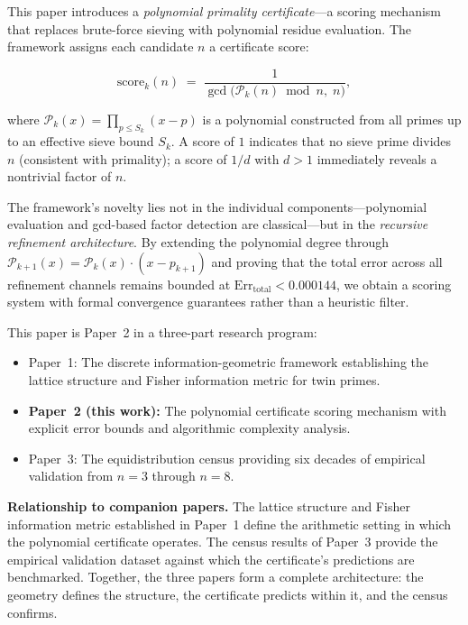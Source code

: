 \documentclass[11pt]{article}
\begin{document}
This paper introduces a \emph{polynomial primality certificate}---a scoring mechanism
that replaces brute-force sieving with polynomial residue evaluation. The framework
assigns each candidate $n$ a certificate score:

\begin{equation}
\mathrm{score}_k(n) \;=\;
\frac{1}{\gcd\!\bigl(\mathcal{P}_k(n)\bmod n,\; n\bigr)},
\end{equation}

\noindent where $\mathcal{P}_k(x) = \prod_{p \le S_k}(x-p)$ is a polynomial
constructed from all primes up to an effective sieve bound $S_k$. A score of $1$
indicates that no sieve prime divides $n$ (consistent with primality); a score
of $1/d$ with $d > 1$ immediately reveals a nontrivial factor of $n$.

The framework's novelty lies not in the individual components---polynomial
evaluation and gcd-based factor detection are classical---but in the
\emph{recursive refinement architecture}. By extending the polynomial degree through
$\mathcal{P}_{k+1}(x) = \mathcal{P}_k(x)\cdot(x-p_{k+1})$ and proving that the
total error across all refinement channels remains bounded at
$\mathrm{Err}_\mathrm{total} < 0.000144$, we obtain a scoring system with formal
convergence guarantees rather than a heuristic filter.

This paper is Paper~2 in a three-part research program:
\begin{itemize}
  \item Paper~1: The discrete information-geometric framework establishing
        the lattice structure and Fisher information metric for twin primes.
  \item \textbf{Paper~2 (this work):} The polynomial certificate scoring mechanism
        with explicit error bounds and algorithmic complexity analysis.
  \item Paper~3: The equidistribution census providing six decades of empirical
        validation from $n=3$ through $n=8$.
\end{itemize}

\noindent\textbf{Relationship to companion papers.} The lattice structure and
Fisher information metric established in Paper~1 define the arithmetic setting
in which the polynomial certificate operates. The census results of Paper~3
provide the empirical validation dataset against which the certificate's
predictions are benchmarked. Together, the three papers form a complete
architecture: the geometry defines the structure, the certificate predicts
within it, and the census confirms.
\end{document}
